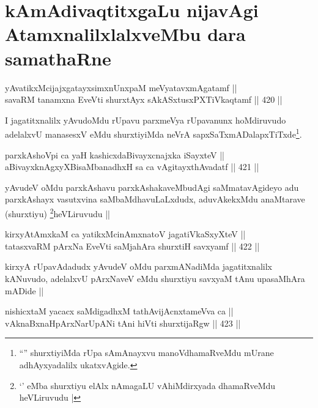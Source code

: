 \section*{kAmAdivaqtitxgaLu nijavAgi AtamxnalilxlalxveMbu dara samathaRne}


\begin{shl}
yAvatikxMcijajxgatayxsimxnUnxpaM meVyatavxmAgatamf || \\
savaRM tanamxna EveVti shurxtAyx sAkASxtusxPXTiVkaqtamf ||  420 ||  
\end{shl}

\begin{artha}
I jagatitxnalilx yAvudoMdu rUpavu parxmeVya rUpavanunx hoMdiruvudo
adelalxvU manasesxV eMdu shurxtiyiMda neVrA
sapxSaTxmADalapxTiTxde\footnote{``\stext'' shurxtiyiMda rUpa
  sAmAnayxvu manoVdhamaRveMdu mUrane adhAyxyadalilx ukatxvAgide.}.
\end{artha}

\begin{shl}
parxkAshoV\s pi ca yaH kashicxdaBivayxcnajxka iSayxteV || \\
aBivayxknAgxyXBisaMbanadhxH sa ca vAgitayxthAvadatf ||  421 ||  
\end{shl}

\begin{artha}
yAvudeV oMdu parxkAshavu parxkAshakaveMbudAgi saMmatavAgideyo adu
parxkAshayx vasutxvina saMbaMdhavuLaLxdudx, aduvAkekxMdu anaMtarave
(shurxtiyu) \footnote{`\stext' eMba shurxtiyu elAlx nAmagaLU
  vAhiMdirxyada dhamaRveMdu heVLiruvudu |}heVLiruvudu ||
\end{artha}

\begin{shl}
kirxyAtAmxkaM ca yatikxMcinAmxnatoV jagatiVkaSxyXteV || \\
tatasxvaRM pArxNa EveVti saMjahAra shurxtiH savxyamf ||  422 ||  
\end{shl}

\begin{artha}
kirxyA rUpavAdadudx yAvudeV oMdu parxmANadiMda jagatitxnalilx
kANuvudo, adelalxvU pArxNaveV eMdu shurxtiyu savxyaM tAnu upasaMhAra
mADide ||
\end{artha}

\begin{shl}
nishicxtaM yacacx saMdigadhxM tathA\s vijAcnxtameVva ca || \\
vAknaBxnaHpArxNarUpANi tAni hiVti shurxtijaRgw ||  423 ||  
\end{shl}

